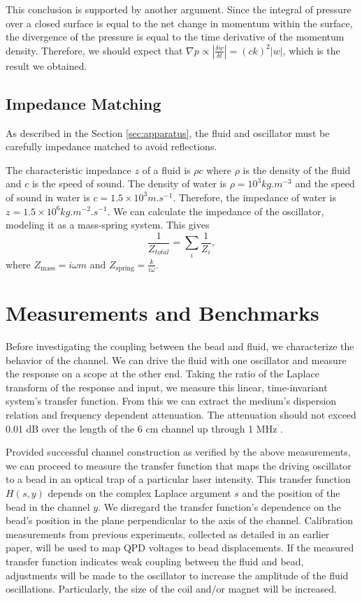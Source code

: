 This conclusion is supported by another argument. Since the integral of pressure over a closed surface is equal to the net change in momentum within the surface, the divergence of the pressure is equal to the time derivative of the momentum density. Therefore, we should expect that $\nabla p \propto \left|\frac{\delta \dot{w}}{\delta t}\right| = (ck)^2 |w|$, which is the result we obtained.

\subsection{Impedance Matching}

As described in the Section \ref{sec:apparatus}, the fluid and oscillator must be carefully impedance matched to avoid reflections.

The characteristic impedance $z$ of a fluid is $\rho c$ where $\rho$ is the density of the fluid and $c$ is the speed of sound. The density of water is $\rho = 10^3 kg.m^{-3}$ and the speed of sound in water is $c = 1.5 \times 10^3 m.s^{-1}$. Therefore, the impedance of water is $z = 1.5\times10^6 kg.m^{-2}.s^{-1}$.  We can calculate the impedance of the oscillator, modeling it as a mass-spring system. This gives
\begin{equation}
\frac{1}{Z_{total}} = \sum_i{\frac{1}{Z_i}},
\end{equation}
where $Z_{\textrm{mass}} = i \omega m$ and $Z_{\textrm{spring}} = \frac{k}{i\omega}$. 

\section{Measurements and Benchmarks}

Before investigating the coupling between the bead and fluid, we characterize the behavior of the channel.  We can drive the fluid with one oscillator and measure the response on a scope at the other end. Taking the ratio of the Laplace transform of the response and input, we measure this linear, time-invariant system's transfer function.  From this we can extract the medium's dispersion relation and frequency dependent attenuation.  The attenuation should not exceed 0.01 dB over the length of the 6 cm channel up through 1 MHz \cite{attenuation}. 

Provided successful channel construction as verified by the above measurements, we can proceed to measure the transfer function that maps the driving oscillator to a bead in an optical trap of a particular laser intensity.  This transfer function $H(s,y)$ depends on the complex Laplace argument $s$ and the position of the bead in the channel $y$.  We disregard the transfer function's dependence on the bead's position in the plane perpendicular to the axis of the channel.  Calibration measurements from previous experiments, collected as detailed in an earlier paper\cite{optTrappingPaper}, will be used to map QPD voltages to bead displacements.  If the measured transfer function indicates weak coupling between the fluid and bead, adjustments will be made to the oscillator to increase the amplitude of the fluid oscillations.  Particularly, the size of the coil and/or magnet will be increased.

